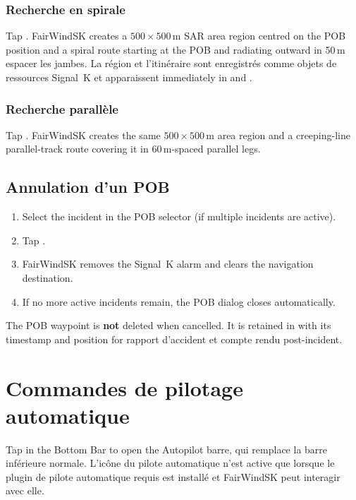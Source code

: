\subsection{Recherche en spirale}

Tap .
FairWindSK creates a $500 \times 500$\,m SAR area region centred on the POB
position and a spiral route starting at the POB and radiating outward in 50\,m
espacer les jambes.
La région et l'itinéraire sont enregistrés comme objets de ressources Signal~K et apparaissent
immediately in  and .

\subsection{Recherche parallèle}

Tap .
FairWindSK creates the same $500 \times 500$\,m area region and a
creeping-line parallel-track route covering it in 60\,m-spaced parallel legs.

\section{Annulation d'un POB}

\begin{enumerate}
  \item Select the incident in the POB selector (if multiple incidents are active).
  \item Tap .
  \item FairWindSK removes the Signal~K alarm and clears the navigation destination.
  \item If no more active incidents remain, the POB dialog closes automatically.
\end{enumerate}

\begin{notebox}
The POB waypoint is \textbf{not} deleted when cancelled.
It is retained in  with its timestamp and position for
rapport d'accident et compte rendu post-incident.
\end{notebox}

\chapter{Commandes de pilotage automatique}
\label{ch:autopilot}

Tap  in the Bottom Bar to open the Autopilot
barre, qui remplace la barre inférieure normale.
L'icône du pilote automatique n'est active que lorsque le plugin de pilote automatique requis est installé et
FairWindSK peut interagir avec elle.


